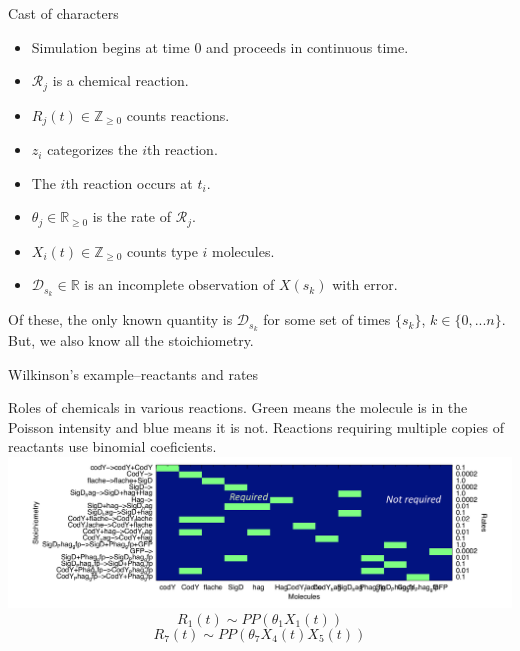 \documentclass[12pt,a4paper,t,xcolor=dvipsnames,slidestop,compress,mathserif]{beamer}
\newcommand{\red}[1]{{\color{red}#1}}
\begin{document}
\begin{frame}{Cast of characters}

\begin{itemize}
\item Simulation begins at time $0$ and proceeds in continuous time.
\item $\mathcal{R}_j$ is a chemical reaction.
\item $R_j(t) \in \mathbb{Z}_{\geq 0}$ counts reactions.
\item $z_i$ categorizes the $i$th reaction.
\item The $i$th reaction occurs at $t_i$.
\item \red{$\theta_j\in \mathbb{R}_{\geq 0}$ is the rate of $\mathcal{R}_j$.}
\item $X_i(t)  \in \mathbb{Z}_{\geq 0}$ counts  type $i$ molecules.
\item $\mathcal{D}_{s_k} \in \mathbb{R}$ is an incomplete observation of $X(s_k)$ with error.
\end{itemize}
Of these, the only known quantity is $\mathcal{D}_{s_k}$ for some set of times $\{s_k\}$, $k \in \{0, ... n\}$. But, we also know all the stoichiometry.

\end{frame}
\begin{frame}{Wilkinson's example--reactants and rates}

{ Roles of chemicals in various reactions. Green means the molecule is in the Poisson intensity and blue means it is not. Reactions requiring multiple copies of reactants use binomial coeficients.}
\includegraphics[scale=0.22]{rmat_fig.png}
$$R_1(t)\sim PP(\theta_1 X_1(t))$$
$$R_7(t)\sim PP(\theta_7 X_4(t)X_5(t))$$
\end{frame}

\end{document}
